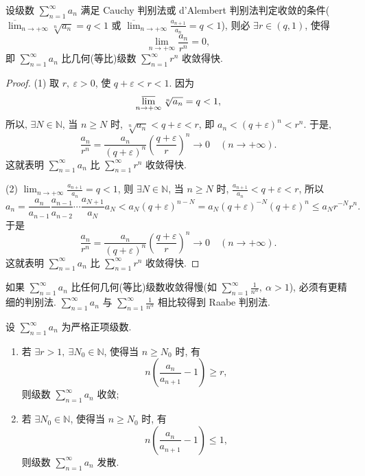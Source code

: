\begin{lemma}\label{lem:12.2.2}
设级数 $\sum_{n=1}^{\infty}a_{n}$ 满足 Cauchy 判别法或 d'Alembert 判别法判定收敛的条件($\overline{\lim}_{n\to+\infty}\sqrt[n]{a_{n}}=q<1$ 或 $\overline{\lim}_{n\to+\infty}\frac{a_{n+1}}{a_{n}}=q<1$), 则必 $\exists r\in(q,1)$, 使得
\[
  \lim_{n\to+\infty}\frac{a_{n}}{r^{n}}=0,
\]
即 $\sum_{n=1}^{\infty}a_{n}$ 比几何(等比)级数 $\sum_{n=1}^{\infty}r^{n}$ 收敛得快.
\end{lemma}

\begin{proof}
(1) 取 $r,\ \varepsilon>0$, 使 $q+\varepsilon<r<1$. 因为
\[
  \varlimsup_{n\to+\infty}\sqrt[n]{a_{n}}=q<1,
\]
所以, $\exists N\in\mathbb{N}$, 当 $n\geqslant N$ 时, $\sqrt[n]{a_{n}}<q+\varepsilon<r$, 即 $a_{n}<(q+\varepsilon)^{n}<r^{n}$. 于是,
\[
  \frac{a_{n}}{r^{n}}=\frac{a_{n}}{(q+\varepsilon)^{n}}\left(\frac{q+\varepsilon}{r}\right)^{n}\to0\quad(n\to+\infty).
\]
这就表明 $\sum_{n=1}^{\infty}a_{n}$ 比 $\sum_{n=1}^{\infty}r^{n}$ 收敛得快.

(2) $\lim_{n\to+\infty}\frac{a_{n+1}}{a_{n}}=q<1$, 则 $\exists N\in\mathbb{N}$, 当 $n\geqslant N$ 时, $\frac{a_{n+1}}{a_{n}}<q+\varepsilon<r$, 所以
\[
  a_{n}=\frac{a_{n}}{a_{n-1}}\frac{a_{n-1}}{a_{n-2}}\cdots\frac{a_{N+1}}{a_{N}}a_{N}
  <a_{N}(q+\varepsilon)^{n-N}=a_{N}(q+\varepsilon)^{-N}(q+\varepsilon)^{n}\leqslant a_{N}r^{-N}r^{n}.
\]
于是
\[
  \frac{a_{n}}{r^{n}}=\frac{a_{n}}{(q+\varepsilon)^{n}}\left(\frac{q+\varepsilon}{r}\right)^{n}\to0\quad(n\to+\infty).
\]
这就表明 $\sum_{n=1}^{\infty}a_{n}$ 比 $\sum_{n=1}^{\infty}r^{n}$ 收敛得快.
\end{proof}

如果 $\sum_{n=1}^{\infty}a_{n}$ 比任何几何(等比)级数收敛得慢(如 $\sum_{n=1}^{\infty}\frac{1}{n^{\alpha}},\ \alpha>1$), 必须有更精细的判别法. $\sum_{n=1}^{\infty}a_{n}$ 与 $\sum_{n=1}^{\infty}\frac{1}{n^{\alpha}}$ 相比较得到 Raabe 判别法.

\begin{theorem}\label{thm:12.2.6}
设 $\sum_{n=1}^{\infty}a_{n}$ 为严格正项级数.
\begin{enumerate}
  \item 若 $\exists r>1,\ \exists N_{0}\in\mathbb{N}$, 使得当 $n\geqslant N_{0}$ 时, 有
  \[
    n\left(\frac{a_{n}}{a_{n+1}}-1\right)\geqslant r,
\]
  则级数 $\sum_{n=1}^{\infty}a_{n}$ 收敛;
  \item 若 $\exists N_{0}\in\mathbb{N}$, 使得当 $n\geqslant N_{0}$ 时, 有
  \[
    n\left(\frac{a_{n}}{a_{n+1}}-1\right)\leqslant1,
\]
  则级数 $\sum_{n=1}^{\infty}a_{n}$ 发散.
\end{enumerate}
\end{theorem}

